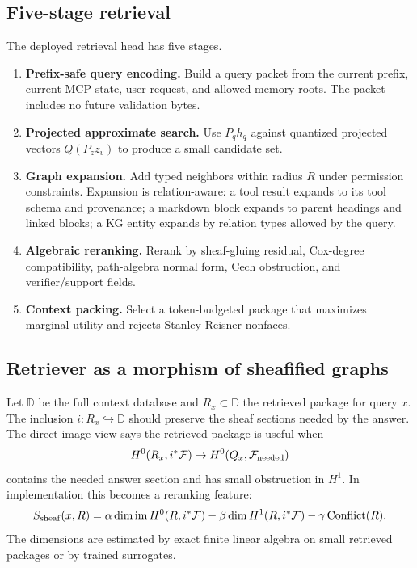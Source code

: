 \documentclass[11pt]{article}
\newcommand{\calF}{\mathcal{F}}
\numberwithin{equation}{section}
\begin{document}
\subsection{Five-stage retrieval}
The deployed retrieval head has five stages.
\begin{enumerate}
\item \textbf{Prefix-safe query encoding.} Build a query packet from the current prefix, current MCP state, user request, and allowed memory roots. The packet includes no future validation bytes.
\item \textbf{Projected approximate search.} Use $P_qh_q$ against quantized projected vectors $Q(P_zz_v)$ to produce a small candidate set.
\item \textbf{Graph expansion.} Add typed neighbors within radius $R$ under permission constraints. Expansion is relation-aware: a tool result expands to its tool schema and provenance; a markdown block expands to parent headings and linked blocks; a KG entity expands by relation types allowed by the query.
\item \textbf{Algebraic reranking.} Rerank by sheaf-gluing residual, Cox-degree compatibility, path-algebra normal form, Cech obstruction, and verifier/support fields.
\item \textbf{Context packing.} Select a token-budgeted package that maximizes marginal utility and rejects Stanley-Reisner nonfaces.
\end{enumerate}

\subsection{Retriever as a morphism of sheafified graphs}
Let $\mathbb{D}$ be the full context database and $R_x\subset \mathbb{D}$ the retrieved package for query $x$. The inclusion $i:R_x\hookrightarrow \mathbb{D}$ should preserve the sheaf sections needed by the answer. The direct-image view says the retrieved package is useful when
\begin{equation}
H^0(R_x,i^*\calF)\to H^0(Q_x,\calF_{\rm needed})
\end{equation}
contains the needed answer section and has small obstruction in $H^1$. In implementation this becomes a reranking feature:
\begin{equation}
S_{\rm sheaf}(x,R)=\alpha\dim \operatorname{im}H^0(R,i^*\calF)-\beta\dim H^1(R,i^*\calF)-\gamma\operatorname{Conflict}(R).
\end{equation}
The dimensions are estimated by exact finite linear algebra on small retrieved packages or by trained surrogates.
\end{document}
